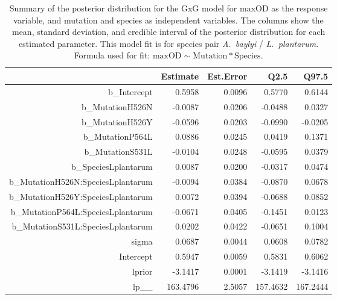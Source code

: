 \begin{table}[ht]
\centering
\begin{tabular}{rrrrr}
  \hline
 & Estimate & Est.Error & Q2.5 & Q97.5 \\ 
  \hline
b\_Intercept & 0.5958 & 0.0096 & 0.5770 & 0.6144 \\ 
  b\_MutationH526N & -0.0087 & 0.0206 & -0.0488 & 0.0327 \\ 
  b\_MutationH526Y & -0.0596 & 0.0203 & -0.0990 & -0.0205 \\ 
  b\_MutationP564L & 0.0886 & 0.0245 & 0.0419 & 0.1371 \\ 
  b\_MutationS531L & -0.0104 & 0.0248 & -0.0595 & 0.0379 \\ 
  b\_SpeciesLplantarum & 0.0087 & 0.0200 & -0.0317 & 0.0474 \\ 
  b\_MutationH526N:SpeciesLplantarum & -0.0094 & 0.0384 & -0.0870 & 0.0678 \\ 
  b\_MutationH526Y:SpeciesLplantarum & 0.0072 & 0.0394 & -0.0688 & 0.0852 \\ 
  b\_MutationP564L:SpeciesLplantarum & -0.0671 & 0.0405 & -0.1451 & 0.0123 \\ 
  b\_MutationS531L:SpeciesLplantarum & 0.0202 & 0.0422 & -0.0651 & 0.1004 \\ 
  sigma & 0.0687 & 0.0044 & 0.0608 & 0.0782 \\ 
  Intercept & 0.5947 & 0.0059 & 0.5831 & 0.6062 \\ 
  lprior & -3.1417 & 0.0001 & -3.1419 & -3.1416 \\ 
  lp\_\_ & 163.4796 & 2.5057 & 157.4632 & 167.2444 \\ 
   \hline
\end{tabular}
\caption{Summary of the posterior distribution for the GxG model for maxOD as the response variable, and mutation and species as independent variables. The columns show the mean, standard deviation, and credible interval of the posterior distribution for each estimated parameter. This model fit is for species pair \textit{A.~baylyi} / \textit{L.~plantarum}.  Formula used for fit: $\text{maxOD} \sim \text{Mutation} * \text{Species}$.} 
\label{supptab:GxG_maxOD_AB_LP}
\end{table}



